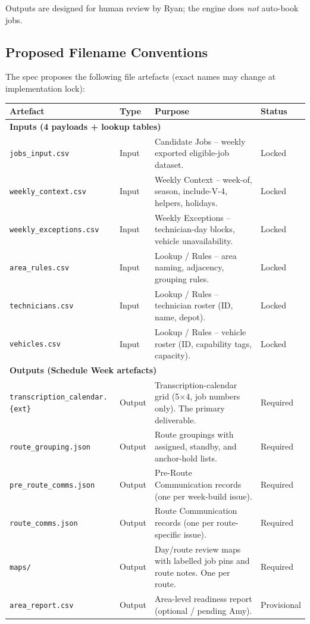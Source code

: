 \documentclass[12pt]{article}
\begin{document}
Outputs are designed for human review by Ryan; the engine does \emph{not} auto-book jobs.

\subsection*{Proposed Filename Conventions}

The spec proposes the following file artefacts (exact names may change at implementation lock):

\medskip
{\small
\begin{longtable}{llp{5.5cm}l}
\toprule
\textbf{Artefact} & \textbf{Type} & \textbf{Purpose} & \textbf{Status} \\
\midrule
\multicolumn{4}{l}{\textbf{Inputs (4 payloads + lookup tables)}} \\
\texttt{jobs\_input.csv}              & Input  & Candidate Jobs -- weekly exported eligible-job dataset. & Locked \\
\texttt{weekly\_context.csv}          & Input  & Weekly Context -- week-of, season, include-V-4, helpers, holidays. & Locked \\
\texttt{weekly\_exceptions.csv}       & Input  & Weekly Exceptions -- technician-day blocks, vehicle unavailability. & Locked \\
\texttt{area\_rules.csv}              & Input  & Lookup / Rules -- area naming, adjacency, grouping rules. & Locked \\
\texttt{technicians.csv}              & Input  & Lookup / Rules -- technician roster (ID, name, depot). & Locked \\
\texttt{vehicles.csv}                 & Input  & Lookup / Rules -- vehicle roster (ID, capability tags, capacity). & Locked \\
\midrule
\multicolumn{4}{l}{\textbf{Outputs (Schedule Week artefacts)}} \\
\texttt{transcription\_calendar.\{ext\}} & Output & Transcription-calendar grid (5$\times$4, job numbers only). The primary deliverable. & Required \\
\texttt{route\_grouping.json}         & Output & Route groupings with assigned, standby, and anchor-hold lists. & Required \\
\texttt{pre\_route\_comms.json}       & Output & Pre-Route Communication records (one per week-build issue). & Required \\
\texttt{route\_comms.json}            & Output & Route Communication records (one per route-specific issue). & Required \\
\texttt{maps/}                        & Output & Day/route review maps with labelled job pins and route notes. One per route. & Required \\
\texttt{area\_report.csv}             & Output & Area-level readiness report (optional / pending Amy). & Provisional \\
\bottomrule
\end{longtable}
}
\end{document}

